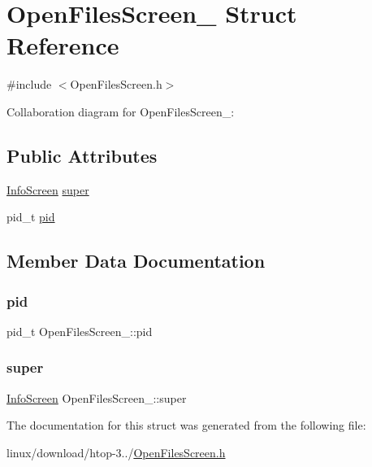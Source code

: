\hypertarget{structOpenFilesScreen__}{}\section{Open\+Files\+Screen\+\_\+ Struct Reference}
\label{structOpenFilesScreen__}


{\ttfamily \#include $<$Open\+Files\+Screen.\+h$>$}



Collaboration diagram for Open\+Files\+Screen\+\_\+\+:
\subsection*{Public Attributes}
\begin{DoxyCompactItemize}
\item 
\hyperlink{InfoScreen_8h_a97139d799c65bdbb53b127e2717369c8}{Info\+Screen} \hyperlink{structOpenFilesScreen___afa52e51608f5982756947cc7e6c23cf0}{super}
\item 
pid\+\_\+t \hyperlink{structOpenFilesScreen___a87d2e7f4b1ef4610c30e000f7b15559e}{pid}
\end{DoxyCompactItemize}


\subsection{Member Data Documentation}
\mbox{\label{structOpenFilesScreen___a87d2e7f4b1ef4610c30e000f7b15559e}} 
\subsubsection{\texorpdfstring{pid}{pid}}
{\footnotesize\ttfamily pid\+\_\+t Open\+Files\+Screen\+\_\+\+::pid}

\mbox{\label{structOpenFilesScreen___afa52e51608f5982756947cc7e6c23cf0}} 
\subsubsection{\texorpdfstring{super}{super}}
{\footnotesize\ttfamily \hyperlink{InfoScreen_8h_a97139d799c65bdbb53b127e2717369c8}{Info\+Screen} Open\+Files\+Screen\+\_\+\+::super}



The documentation for this struct was generated from the following file\+:\begin{DoxyCompactItemize}
\item 
linux/download/htop-\/3../\hyperlink{OpenFilesScreen_8h}{Open\+Files\+Screen.\+h}\end{DoxyCompactItemize}
